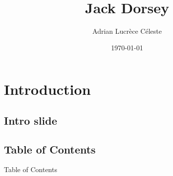 \documentclass[xcolor=svgnames,handout]{beamer}
\title[JD\hspace{2em}] {Jack Dorsey}
\author{Adrian Lucr\`{e}ce C\'{e}leste}
\date{\today}
\institute{Norwich High School}
\begin{document}
\section{Introduction}

\subsection{Intro slide}
\maketitle


\subsection{Table of Contents}

\begin{frame}[allowframebreaks]{Table of Contents}
	\tableofcontents
\end{frame}
\end{document}
